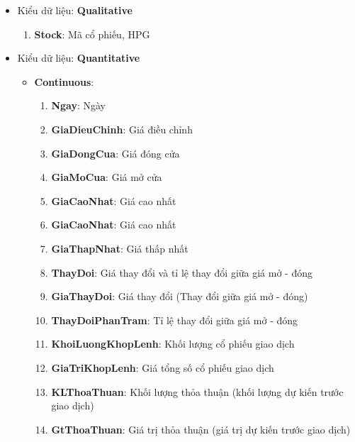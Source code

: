     \begin{itemize}
        \item Kiểu dữ liệu: \textbf{Qualitative} 
        \begin{enumerate}
            \item \textbf{Stock}: Mã cổ phiếu, HPG
        \end{enumerate}
    
        \item Kiểu dữ liệu: \textbf{Quantitative} 
        \begin{itemize}
            \item \textbf{Continuous}:
             \begin{enumerate}[resume]
                \item \textbf{Ngay}: Ngày

                \item \textbf{GiaDieuChinh}: Giá điều chỉnh
 
                \item \textbf{GiaDongCua}: Giá đóng cửa

                \item \textbf{GiaMoCua}: Giá mở cửa

                \item \textbf{GiaCaoNhat}: Giá cao nhất

                \item \textbf{GiaCaoNhat}: Giá cao nhất
                \item \textbf{GiaThapNhat}: Giá thấp nhất
    
                \item \textbf{ThayDoi}: Giá thay đổi và tỉ lệ thay đổi giữa giá mở - đóng
                
                \item \textbf{GiaThayDoi}: Giá thay đổi (Thay đổi giữa giá mở - đóng)
                \item \textbf{ThayDoiPhanTram}: Tỉ lệ thay đổi giữa giá mở - đóng
                \item \textbf{KhoiLuongKhopLenh}: Khối lượng cổ phiếu giao dịch
                \item \textbf{GiaTriKhopLenh}: Giá tổng số cổ phiếu giao dịch
                \item \textbf{KLThoaThuan}: Khối lượng thỏa thuận (khối lượng dự kiến trước giao dịch)
                \item \textbf{GtThoaThuan}: Giá trị thỏa thuận (giá trị dự kiến trước giao dịch)
            \end{enumerate}

        \end{itemize}

    \end{itemize}


